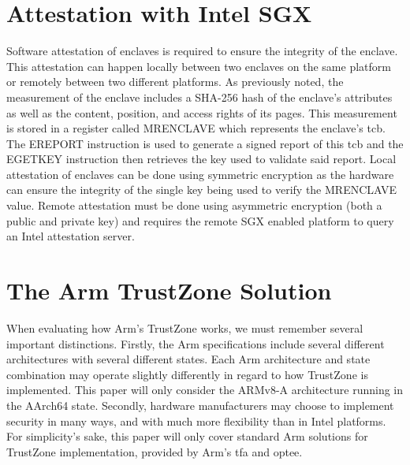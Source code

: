 \section{Attestation with Intel SGX}
Software attestation of enclaves is required to ensure the integrity of the enclave. This attestation can happen locally between two enclaves on the same platform or remotely between two different platforms. As previously noted, the measurement of the enclave includes a SHA-256 hash of the enclave's attributes as well as the content, position, and access rights of its pages. This measurement is stored in a register called MRENCLAVE which represents the enclave's \gls{tcb}. The EREPORT instruction is used to generate a signed report of this \gls{tcb} and the EGETKEY instruction then retrieves the key used to validate said report. Local attestation of enclaves can be done using symmetric encryption as the hardware can ensure the integrity of the single key being used to verify the MRENCLAVE value. Remote attestation must be done using asymmetric encryption (both a public and private key) and requires the remote SGX enabled platform to query an Intel attestation server. 

\section{The Arm TrustZone Solution}
When evaluating how Arm’s TrustZone works, we must remember several important distinctions. Firstly, the Arm specifications include several different architectures with several different states. Each Arm architecture and state combination may operate slightly differently in regard to how TrustZone is implemented. This paper will only consider the ARMv8-A architecture running in the AArch64 state. Secondly, hardware manufacturers may choose to implement security in many ways, and with much more flexibility than in Intel platforms. For simplicity’s sake, this paper will only cover standard Arm solutions for TrustZone implementation, provided by Arm's \gls{tfa} and \gls{optee}.
 
